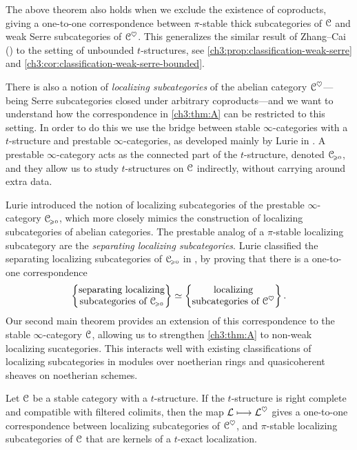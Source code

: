 The above theorem also holds when we exclude the existence of coproducts, giving a one-to-one correspondence between $\pi$-stable thick subcategories of $\EuScript{C}$ and weak Serre subcategories of $\EuScript{C}^\heartsuit$. This generalizes the similar result of Zhang--Cai (\cite{zhang-cai_2017}) to the setting of unbounded $t$-structures, see \cref{ch3:prop:classification-weak-serre} and \cref{ch3:cor:classification-weak-serre-bounded}. 

There is also a notion of \emph{localizing subcategories} of the abelian category $\EuScript{C}^\heartsuit$---being Serre subcategories closed under arbitrary coproducts---and we want to understand how the correspondence in \cref{ch3:thm:A} can be restricted to this setting. In order to do this we use the bridge between stable $\infty$-categories with a $t$-structure and prestable $\infty$-categories, as developed mainly by Lurie in \cite[App. C]{lurie_SAG}. A prestable $\infty$-category acts as the connected part of the $t$-structure, denoted $\EuScript{C}_{\hspace{-1pt}\scriptscriptstyle\geqslant 0}$, and they allow us to study $t$-structures on $\EuScript{C}$ indirectly, without carrying around extra data. 

Lurie introduced the notion of localizing subcategories of the prestable $\infty$-category $\EuScript{C}_{\hspace{-1pt}\scriptscriptstyle\geqslant 0}$, which more closely mimics the construction of localizing subcategories of abelian categories. The prestable analog of a $\pi$-stable localizing subcategory are the \emph{separating localizing subcategories}. Lurie classified the separating localizing subcategories of $\EuScript{C}_{\hspace{-1pt}\scriptscriptstyle\geqslant 0}$ in \cite[C.5.2.7]{lurie_SAG}, by proving that there is a one-to-one correspondence
\[\left\{ \begin{matrix} \text{separating localizing}\\ \text{subcategories of }\EuScript{C}_{\hspace{-1pt}\scriptscriptstyle\geqslant 0} \end{matrix} \right\} \simeq \left\{ \begin{matrix} \text{localizing}\\ \text{subcategories of }\EuScript{C}^\heartsuit \end{matrix} \right\}.\]
Our second main theorem provides an extension of this correspondence to the stable $\infty$-category $\EuScript{C}$, allowing us to strengthen \cref{ch3:thm:A} to non-weak localizing sucategories. This interacts well with existing classifications of localizing subcategories in modules over noetherian rings and quasicoherent sheaves on noetherian schemes. 


\begin{introthm}
    \label{ch3:thm:B}
    Let $\EuScript{C}$ be a stable category with a $t$-structure. If the $t$-structure is right complete and compatible with filtered colimits, then the map $\mathcal{L}\longmapsto \mathcal{L}^\heartsuit$ gives a one-to-one correspondence between localizing subcategories of $\EuScript{C}^\heartsuit$, and $\pi$-stable localizing subcategories of $\EuScript{C}$ that are kernels of a $t$-exact localization.
\end{introthm}

